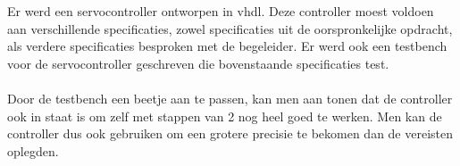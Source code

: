 Er werd een servocontroller ontworpen in \gls{vhdl}. Deze controller moest voldoen aan verschillende specificaties, zowel specificaties uit de oorspronkelijke opdracht, als verdere specificaties besproken met de begeleider. Er werd ook een testbench voor de servocontroller geschreven die bovenstaande specificaties test.\\
\\
\noindent
Door de testbench een beetje aan te passen, kan men aan tonen dat de controller ook in staat is om zelf met stappen van 2 nog heel goed te werken. Men kan de controller dus ook gebruiken om een grotere precisie te bekomen dan de vereisten oplegden.